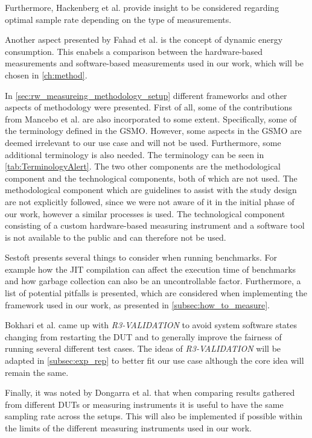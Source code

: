 Furthermore, Hackenberg et al.\cite{hackenberg2013} provide insight to be considered regarding optimal sample rate depending on the type of measurements.

Another aspect presented by Fahad et al.\cite{fahad2019comparative} is the concept of dynamic energy consumption. This enabels a comparison between the hardware-based measurements and software-based measurements used in our work, which will be chosen in \cref{ch:method}.\newline


In \cref{sec:rw_measureing_methodology_setup} different frameworks and other aspects of methodology were presented. First of all, some of the contributions from Mancebo et al. \cite{GarciaFEETINGS} are also incorporated to some extent. Specifically, some of the terminology defined in the GSMO. However, some aspects in the GSMO are deemed irrelevant to our use case and will not be used. Furthermore, some additional terminology is also needed. The terminology can be seen in \cref{tab:TerminologyAlert}. The two other components are the methodological component and the technological components, both of which are not used. The methodological component which are guidelines to assist with the study design are not explicitly followed, since we were not aware of it in the initial phase of our work, however a similar processes is used. The technological component consisting of a custom hardware-based measuring instrument and a software tool is not available to the public and can therefore not be used.

Sestoft\cite{sestoft2013microbenchmarks} presents several things to consider when running benchmarks. For example how the JIT compilation can affect the execution time of benchmarks and how garbage collection can also be an uncontrollable factor. Furthermore, a list of potential pitfalls is presented, which are considered when implementing the framework used in our work, as presented in \cref{subsec:how_to_measure}.

Bokhari et al.\cite{Bokhari2020r3} came up with \textit{R3-VALIDATION} to avoid system software states changing from restarting the DUT and to generally improve the fairness of running several different test cases. The ideas of \textit{R3-VALIDATION} will be adapted in \cref{subsec:exp_rep} to better fit our use case although the core idea will remain the same.

Finally, it was noted by Dongarra et al.\cite{Dongarra2012} that when comparing results gathered from different DUTs or measuring instruments it is useful to have the same sampling rate across the setups. This will also be implemented if possible within the limits of the different measuring instruments used in our work.

